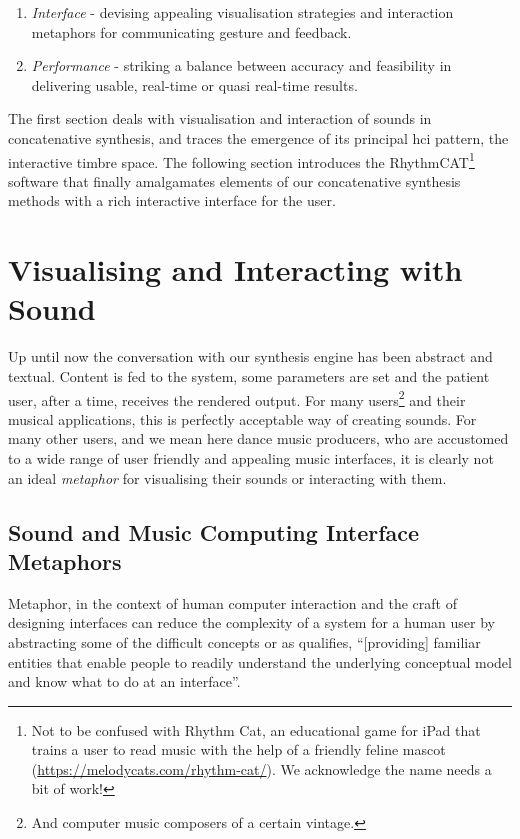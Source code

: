 \begin{enumerate}
  \item \textit{Interface} - devising appealing visualisation strategies and interaction metaphors for communicating gesture and feedback.
  \item \textit{Performance} - striking a balance between accuracy and feasibility in delivering usable, real-time or quasi real-time results. 
\end{enumerate}

The first section deals with visualisation and interaction of sounds in concatenative synthesis, and traces the emergence of its principal \acrshort{hci} pattern, the interactive timbre space. The following section introduces the RhythmCAT\footnote{Not to be confused with  Rhythm Cat, an educational game for iPad that trains a user to read music with the help of a friendly feline mascot (\url{https://melodycats.com/rhythm-cat/}). We acknowledge the name needs a bit of work!} software that finally amalgamates elements of our concatenative synthesis methods with a rich interactive interface for the user.

\section{Visualising and Interacting with Sound}

Up until now the conversation with our synthesis engine has been abstract and textual. Content is fed to the system, some parameters are set and the patient user, after a time, receives the rendered output. For many users\footnote{And computer music composers of a certain vintage.} and their musical applications, this is perfectly acceptable way of creating sounds. For many other users, and we mean here dance music producers, who are accustomed to a wide range of user friendly and appealing music interfaces, it is clearly not an ideal \textit{metaphor} for visualising their sounds or interacting with them. 

\subsection{Sound and Music Computing Interface Metaphors}

Metaphor, in the context of human computer interaction and the craft of designing interfaces can reduce the complexity of a system for a human user by abstracting some of the difficult  concepts or as \citep{Rogers2011} qualifies, ``[providing] familiar entities that enable people to readily understand the underlying conceptual model and know what to do at an interface''.

